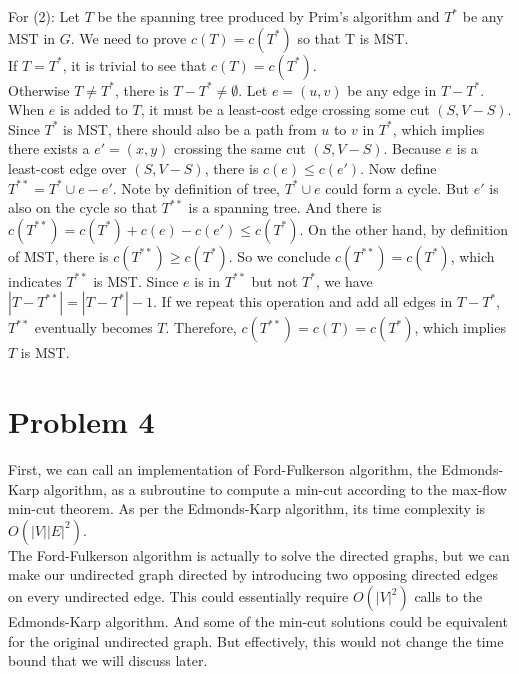 \documentclass[titlepage, paper=a4, fontsize=11pt]{scrartcl} %
\numberwithin{equation}{section} %
\numberwithin{figure}{section} %
\numberwithin{table}{section} %
\begin{document}
For (2): Let $T$ be the spanning tree produced by Prim's algorithm and $T^*$ be any MST in $G$. We need to prove $c(T)=c(T^*)$ so that T is MST. \\
If $T=T^*$, it is trivial to see that $c(T)=c(T^*)$. \\
Otherwise $T \neq T^*$, there is $T-T^* \neq \emptyset$. Let $e=(u,v)$ be any edge in $T-T^*$. When
$e$ is added to $T$, it must be a least-cost edge crossing some cut $(S, V-S)$. Since $T^*$ is MST, there should also be a path from $u$ to $v$ in $T^*$, which implies there exists a $e'=(x,y)$ crossing the same cut $(S, V-S)$. Because $e$ is a least-cost edge over $(S, V-S)$, there is $c(e) \leq c(e')$. Now define $T^{**}=T^* \cup e - e'$. Note by definition of tree, $T^* \cup e$ could form a cycle. But $e'$ is also on the cycle so that $T^{**}$ is a spanning tree. And there is $c(T^{**})=c(T^*)+c(e)-c(e') \leq c(T^*)$. On the other hand, by definition of MST, there is $c(T^{**}) \geq c(T^*)$. So we conclude $c(T^{**})=c(T^*)$, which indicates $T^{**}$ is MST. Since $e$ is in $T^{**}$ but not $T^*$, we have $|T-T^{**}|=|T-T^*|-1$. If we repeat this operation and add all edges in $T-T^*$, $T^{**}$ eventually becomes $T$. Therefore, $c(T^{**})=c(T)=c(T^*)$, which implies $T$ is MST. \\






\section*{Problem 4}
First, we can call an implementation of Ford-Fulkerson algorithm, the Edmonds-Karp algorithm, as a subroutine to compute a min-cut according to the max-flow min-cut theorem. As per the Edmonds-Karp algorithm, its time complexity is $O(|V||E|^2)$. \\

The Ford-Fulkerson algorithm is actually to solve the directed graphs, but we can make our undirected graph directed by introducing two opposing directed edges on every undirected edge. This could essentially require $O(|V|^2)$ calls to the Edmonds-Karp algorithm. And some of the min-cut solutions could be equivalent for the original undirected graph. But effectively, this would not change the time bound that we will discuss later. \\
\end{document}
